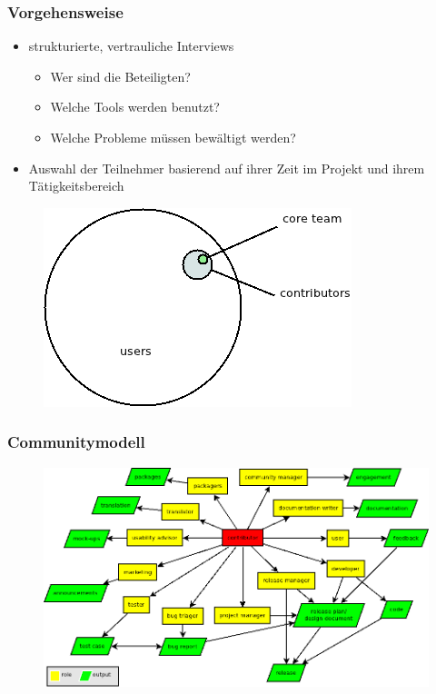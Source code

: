 \documentclass{beamer}
\begin{document}
\begin{frame}
\frametitle{Vorgehensweise}
\begin{itemize}
 \item strukturierte, vertrauliche Interviews
     \begin{itemize}
        \item Wer sind die Beteiligten?
        \item Welche Tools werden benutzt?
        \item Welche Probleme m\"ussen bew\"altigt werden?
     \end{itemize}
 \item Auswahl der Teilnehmer basierend auf ihrer Zeit im Projekt und ihrem T\"atigkeitsbereich
\end{itemize}
\begin{figure}[h!]
 \centering
 \includegraphics[scale=0.35,keepaspectratio=true]{./communitymodel.png}
\end{figure}
\end{frame}

\begin{frame}
\frametitle{Communitymodell}
\begin{figure}[h!]
 \centering
 \includegraphics[scale=0.35,keepaspectratio=true]{./ontology.png}
\end{figure}
\end{frame}
\end{document}
